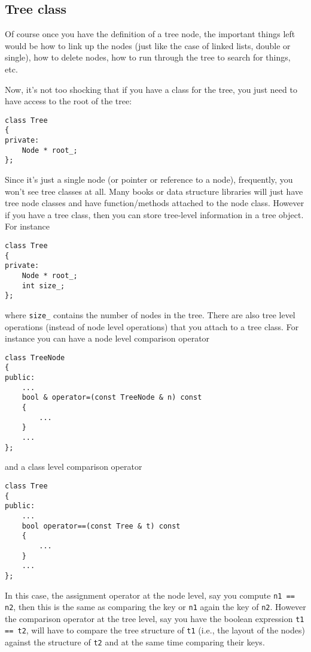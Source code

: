 \newpage
\subsection{Tree class}

Of course once you have the definition of a tree node, 
the important things left would be how to link up the nodes
(just like the case of linked lists, double or single),
how to delete nodes, 
how to run through the tree to search for things, etc.

Now, it's not too shocking that if you have a class for the 
tree, you just need to have access to the root of the tree:
{\small
\begin{Verbatim}[frame=single]
class Tree
{
private:
    Node * root_;
};
\end{Verbatim}
}

Since it's just a single node (or pointer or reference to a node),
frequently, you won't see tree classes at all.
Many books or data structure libraries will just have tree node classes
and have function/methods attached to the node class.
However if you have a tree class, then you can store tree-level
information in a tree object.
For instance
{\small
\begin{Verbatim}[frame=single]
class Tree
{
private:
    Node * root_;
    int size_;
};
\end{Verbatim}
}
where \verb!size_! contains the number of nodes in the tree.
There are also tree level operations (instead of node level operations)
that you attach to a tree class.
For instance you can have a node level comparison operator
{\small
\begin{Verbatim}[frame=single]
class TreeNode
{
public:
    ...
    bool & operator=(const TreeNode & n) const
    {
        ...
    }
    ...
};
\end{Verbatim}
}
and a class
level comparison operator
{\small
\begin{Verbatim}[frame=single]
class Tree
{
public:
    ...
    bool operator==(const Tree & t) const
    {
        ...
    }
    ...
};
\end{Verbatim}
}
In this case, the assignment operator at the node level,
say you compute \texttt{n1 == n2},
then this is the same as comparing the key or \texttt{n1}
again the key of \texttt{n2}.
However the comparison operator at the tree level,
say you have the boolean expression \texttt{t1 == t2},
will have to compare the tree structure of \texttt{t1}
(i.e., the layout of the nodes)
against the structure of \texttt{t2} and at the
same time comparing their keys.


